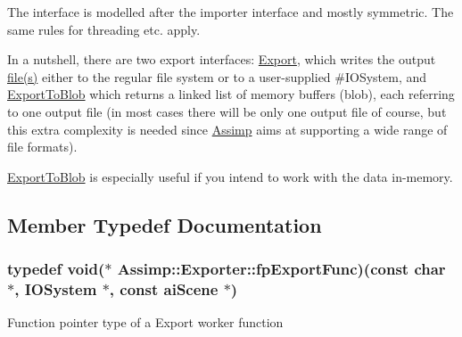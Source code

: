 The interface is modelled after the importer interface and mostly symmetric. The same rules for threading etc. apply.

In a nutshell, there are two export interfaces\+: \hyperlink{class_assimp_1_1_exporter_a3226ea1a598a94c899fa17acebe5d47d}{Export}, which writes the output \hyperlink{structfile}{file(s)} either to the regular file system or to a user-\/supplied \#\+I\+O\+System, and \hyperlink{class_assimp_1_1_exporter_a534989e16682cc20fde977f9f859aa29}{Export\+To\+Blob} which returns a linked list of memory buffers (blob), each referring to one output file (in most cases there will be only one output file of course, but this extra complexity is needed since \hyperlink{class_assimp}{Assimp} aims at supporting a wide range of file formats).

\hyperlink{class_assimp_1_1_exporter_a534989e16682cc20fde977f9f859aa29}{Export\+To\+Blob} is especially useful if you intend to work with the data in-\/memory. 

\subsection{Member Typedef Documentation}
\hypertarget{class_assimp_1_1_exporter_aa67334a75cb24e030af984d01e622f3b}{
\subsubsection[{fp\+Export\+Func}]{\setlength{\rightskip}{0pt plus 5cm}typedef void($\ast$ Assimp\+::\+Exporter\+::fp\+Export\+Func)(const char $\ast$, {\bf I\+O\+System} $\ast$, const {\bf ai\+Scene} $\ast$)}}\label{class_assimp_1_1_exporter_aa67334a75cb24e030af984d01e622f3b}
Function pointer type of a Export worker function 

